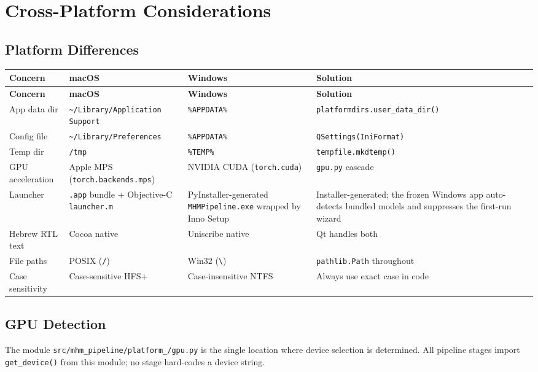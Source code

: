 \documentclass[12pt]{article}
\newcommand{\filepath}[1]{\texttt{\small #1}}
\newcommand{\code}[1]{\texttt{#1}}
\begin{document}
\section{Cross-Platform Considerations}
\label{sec:crossplatform}

\subsection{Platform Differences}

\begin{longtable}{|p{3cm}|p{3.5cm}|p{3.5cm}|p{3cm}|}
\hline
\textbf{Concern} & \textbf{macOS} & \textbf{Windows} & \textbf{Solution} \\
\hline
\endfirsthead
\hline
\textbf{Concern} & \textbf{macOS} & \textbf{Windows} & \textbf{Solution} \\
\hline
\endhead
\hline
\endfoot
App data dir & \code{\textasciitilde/Library/Application Support} & \code{\%APPDATA\%} & \code{platformdirs.user\_data\_dir()} \\
\hline
Config file & \code{\textasciitilde/Library/Preferences} & \code{\%APPDATA\%} & \code{QSettings(IniFormat)} \\
\hline
Temp dir & \code{/tmp} & \code{\%TEMP\%} & \code{tempfile.mkdtemp()} \\
\hline
GPU acceleration & Apple MPS (\code{torch.backends.mps}) & NVIDIA CUDA (\code{torch.cuda}) & \code{gpu.py} cascade \\
\hline
Launcher & \code{.app} bundle + Objective-C \code{launcher.m} & PyInstaller-generated \code{MHMPipeline.exe} wrapped by Inno Setup & Installer-generated; the frozen Windows app auto-detects bundled models and suppresses the first-run wizard \\
\hline
Hebrew RTL text & Cocoa native & Uniscribe native & Qt handles both \\
\hline
File paths & POSIX (\code{/}) & Win32 (\code{\textbackslash}) & \code{pathlib.Path} throughout \\
\hline
Case sensitivity & Case-sensitive HFS+ & Case-insensitive NTFS & Always use exact case in code \\
\hline
\end{longtable}

\subsection{GPU Detection}

The module \filepath{src/mhm\_pipeline/platform\_/gpu.py} is the single location where device selection is determined. All pipeline stages import \code{get\_device()} from this module; no stage hard-codes a device string.
\end{document}

